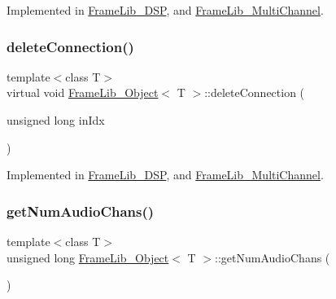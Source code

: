 Implemented in \hyperlink{class_frame_lib___d_s_p_a42ab6ff22056a188a33ecadcd2ea477d}{Frame\+Lib\+\_\+\+D\+SP}, and \hyperlink{class_frame_lib___multi_channel_aa7dfda2331a430b0db3f43d3bde293aa}{Frame\+Lib\+\_\+\+Multi\+Channel}.

\mbox{\label{class_frame_lib___object_a4ed6892941c7b68c885b38c202f336b3}} 
\subsubsection{\texorpdfstring{delete\+Connection()}{deleteConnection()}}
{\footnotesize\ttfamily template$<$class T$>$ \\
virtual void \hyperlink{class_frame_lib___object}{Frame\+Lib\+\_\+\+Object}$<$ T $>$\+::delete\+Connection (\begin{DoxyParamCaption}\item[{unsigned long}]{in\+Idx }\end{DoxyParamCaption})\hspace{0.3cm}{\ttfamily [pure virtual]}}



Implemented in \hyperlink{class_frame_lib___d_s_p_ad828d2b359466e9ff2f0f6002d580d18}{Frame\+Lib\+\_\+\+D\+SP}, and \hyperlink{class_frame_lib___multi_channel_ad8b21345a7b864a48060d2475af2fe1e}{Frame\+Lib\+\_\+\+Multi\+Channel}.

\mbox{\label{class_frame_lib___object_ae3b9c6438cc170618c221fc96612d19b}} 
\subsubsection{\texorpdfstring{get\+Num\+Audio\+Chans()}{getNumAudioChans()}}
{\footnotesize\ttfamily template$<$class T$>$ \\
unsigned long \hyperlink{class_frame_lib___object}{Frame\+Lib\+\_\+\+Object}$<$ T $>$\+::get\+Num\+Audio\+Chans (\begin{DoxyParamCaption}{ }\end{DoxyParamCaption})\hspace{0.3cm}{\ttfamily [inline]}}

